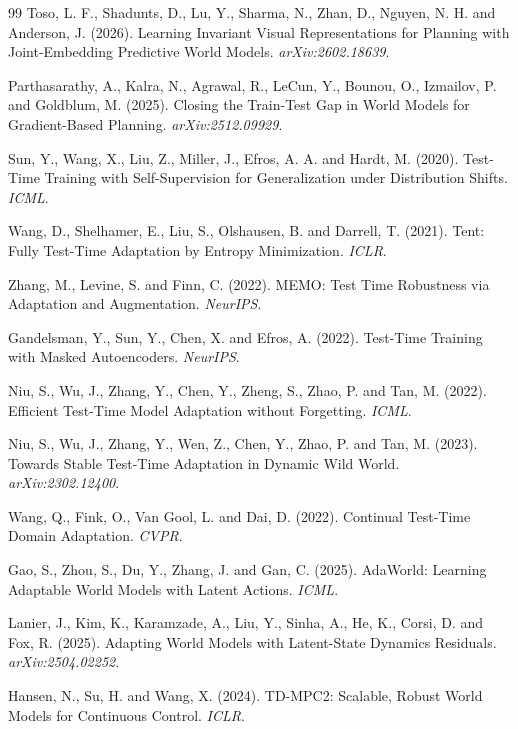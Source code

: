 \begin{thebibliography}{99}
Toso, L. F., Shadunts, D., Lu, Y., Sharma, N., Zhan, D., Nguyen, N. H. and Anderson, J. (2026).
Learning Invariant Visual Representations for Planning with Joint-Embedding Predictive World
Models. \textit{arXiv:2602.18639}.

Parthasarathy, A., Kalra, N., Agrawal, R., LeCun, Y., Bounou, O., Izmailov, P. and Goldblum,
M. (2025). Closing the Train-Test Gap in World Models for Gradient-Based Planning.
\textit{arXiv:2512.09929}.

Sun, Y., Wang, X., Liu, Z., Miller, J., Efros, A. A. and Hardt, M. (2020). Test-Time Training
with Self-Supervision for Generalization under Distribution Shifts. \textit{ICML}.

Wang, D., Shelhamer, E., Liu, S., Olshausen, B. and Darrell, T. (2021). Tent: Fully Test-Time
Adaptation by Entropy Minimization. \textit{ICLR}.

Zhang, M., Levine, S. and Finn, C. (2022). MEMO: Test Time Robustness via Adaptation and
Augmentation. \textit{NeurIPS}.

Gandelsman, Y., Sun, Y., Chen, X. and Efros, A. (2022). Test-Time Training with Masked
Autoencoders. \textit{NeurIPS}.

Niu, S., Wu, J., Zhang, Y., Chen, Y., Zheng, S., Zhao, P. and Tan, M. (2022). Efficient
Test-Time Model Adaptation without Forgetting. \textit{ICML}.

Niu, S., Wu, J., Zhang, Y., Wen, Z., Chen, Y., Zhao, P. and Tan, M. (2023). Towards Stable
Test-Time Adaptation in Dynamic Wild World. \textit{arXiv:2302.12400}.

Wang, Q., Fink, O., Van Gool, L. and Dai, D. (2022). Continual Test-Time Domain Adaptation.
\textit{CVPR}.

Gao, S., Zhou, S., Du, Y., Zhang, J. and Gan, C. (2025). AdaWorld: Learning Adaptable World
Models with Latent Actions. \textit{ICML}.

Lanier, J., Kim, K., Karamzade, A., Liu, Y., Sinha, A., He, K., Corsi, D. and Fox, R. (2025).
Adapting World Models with Latent-State Dynamics Residuals. \textit{arXiv:2504.02252}.

Hansen, N., Su, H. and Wang, X. (2024). TD-MPC2: Scalable, Robust World Models for Continuous
Control. \textit{ICLR}.


\end{thebibliography}
